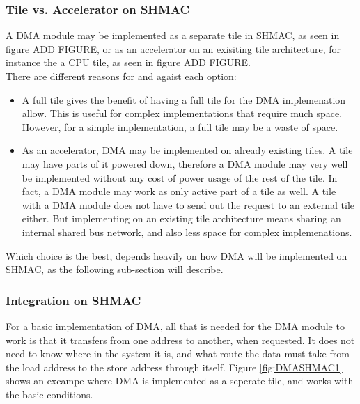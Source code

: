 \subsubsection{Tile vs. Accelerator on SHMAC}

A DMA module may be implemented as a separate tile in SHMAC, as seen in figure  ADD FIGURE, or as an accelerator on an exisiting tile architecture, for instance the a CPU tile, as seen in figure  ADD FIGURE.
\\ There are different reasons for and agaist each option:
\begin{itemize}
    \item A full tile gives the benefit of having a full tile for the DMA implemenation allow.
    This is useful for complex implementations that require much space.
    However, for a simple implementation, a full tile may be a waste of space.
    \item As an accelerator, DMA may be implemented on already existing tiles.
    A tile may have parts of it powered down, therefore a DMA module may very well be implemented without any cost of power usage of the rest of the tile.
    In fact, a DMA module may work as only active part of a tile as well.
    A tile with a DMA module does not have to send out the request to an external tile either.
    But implementing on an existing tile architecture means sharing an internal shared bus network, and also less space for complex implemenations.
\end{itemize}
Which choice is the best, depends heavily on how DMA will be implemented on SHMAC, as the following sub-section will describe.

\subsubsection{Integration on SHMAC}
For a basic implementation of DMA, all that is needed for the DMA module to work is that it transfers from one address to another, when requested.
It does not need to know where in the system it is, and what route the data must take from the load address to the store address through itself.
Figure \ref{fig:DMASHMAC1} shows an excampe where DMA is implemented as a seperate tile, and works with the basic conditions.

